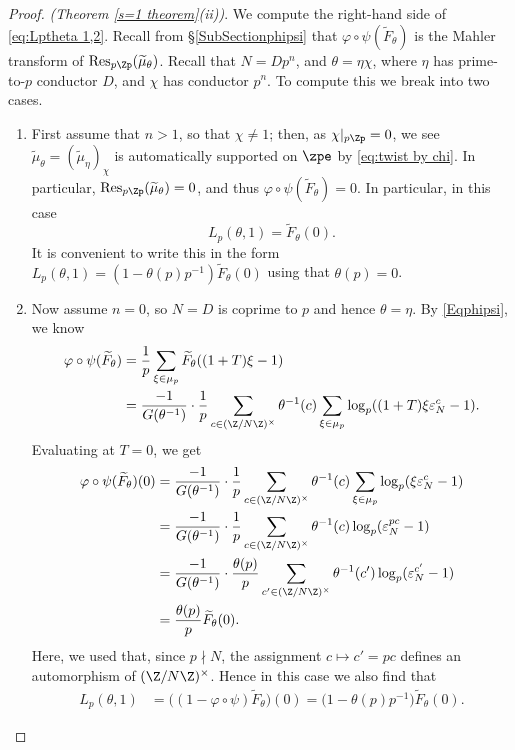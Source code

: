 \documentclass[a4paper,10pt, english, reqno]{smfart}
\numberwithin{equation}{section}
\begin{document}
\begin{proof}\emph{(Theorem \ref{s=1 theorem}(ii))}.
We compute the right-hand side of \eqref{eq:Lptheta 1,2}. Recall from \S\ref{SubSectionphipsi} that $\varphi\circ\psi(\widetilde{F}_\theta)$ is the Mahler transform of $\mathrm{Res}_{p\Zp}(\widetilde{\mu}_\theta)$. Recall that $N = Dp^n$, and $\theta = \eta\chi$, where $\eta$ has prime-to-$p$ conductor $D$, and $\chi$ has conductor $p^n$. To compute this we break into two cases.

\begin{enumerate}
\item First assume that $n > 1$, so that $\chi \neq 1$; then, as $\chi|_{p\Zp} = 0$, we see $\widetilde{\mu}_\theta = (\widetilde{\mu}_\eta)_\chi$ is automatically supported on $\zpe$ by \eqref{eq:twist by chi}. In particular, $\mathrm{Res}_{p\Zp}(\widetilde{\mu}_\theta) = 0$, and thus $\varphi\circ\psi(\widetilde{F}_\theta) = 0$. In particular, in this case
\[
L_p(\theta,1) = \widetilde{F}_\theta(0).
\]
It is convenient to write this in the form $L_p(\theta,1) = (1-\theta(p)p^{-1})\widetilde{F}_\theta(0)$ using that $\theta(p) = 0$.


\item Now assume $n = 0$, so $N = D$ is coprime to $p$ and hence $\theta = \eta$.  By \eqref{Eqphipsi}, we know
\begin{align*}
\varphi\circ\psi(\widetilde{F}_\theta) &= \frac{1}{p}\sum_{\xi \in \mu_p} \widetilde{F}_\theta((1+T)\xi - 1)\\
&= \frac{-1}{G(\theta^{-1})} \cdot \frac{1}{p}\sum_{c\in (\Z/N\Z)^\times}\theta^{-1}(c)\sum_{\xi \in \mu_p} \log_p ((1+T)\xi\varepsilon_N^c - 1).
\end{align*}
Evaluating at $T = 0$, we get
\begin{align*}
  \varphi\circ\psi(\widetilde{F}_\theta)(0) &=   \frac{-1}{G(\theta^{-1})} \cdot \frac{1}{p}\sum_{c\in (\Z/N\Z)^\times}\theta^{-1}(c)\sum_{\xi \in \mu_p} \log_p(\xi\varepsilon_N^c - 1)\\
  &= \frac{-1}{G(\theta^{-1})} \cdot \frac{1}{p}\sum_{c\in (\Z/N\Z)^\times}\theta^{-1}(c)\log_p(\varepsilon_N^{pc} - 1) \\
  &=\frac{-1}{G(\theta^{-1})} \cdot \frac{\theta(p)}{p}\sum_{c'\in (\Z/N\Z)^\times}\theta^{-1}(c')\log_p(\varepsilon_N^{c'} - 1)\\
 &= \frac{\theta(p)}{p} \widetilde{F}_\theta(0).
\end{align*}
Here, we used that, since $p\nmid N$, the assignment $c \mapsto c' = pc$ defines an automorphism of $(\Z / N\Z)^\times$. Hence in this case we also find that 
\begin{align*}
    L_p(\theta,1) &= \Big((1-\varphi\circ\psi)\widetilde{F}_\theta\Big)(0) = \Big(1 - \theta(p)p^{-1}\Big) \widetilde{F}_\theta(0).
\end{align*}
\end{enumerate}


\end{proof}
\end{document}
